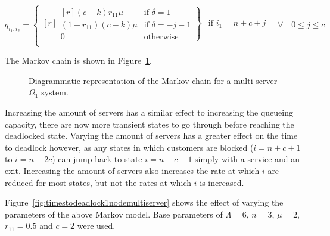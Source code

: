 \documentclass{article}
\begin{document}
\begin{equation}
  q_{i_1, i_2} = \left\{
  \begin{matrix*}[ r ]
    \left. \begin{matrix*}[ r ]
      (c-k)r_{11}\mu & \text{if } \delta = 1 \\
      (1-r_{11})(c-k)\mu & \text{if } \delta = -j-1\\
      0 & \text{otherwise}
    \end{matrix*} \right\} & \text{if } i_1 = n + c + j \\
  \end{matrix*} \right.
  \quad \forall \quad 0 \leq j \leq c
\end{equation}

The Markov chain is shown in Figure~\ref{fig:1nodeMCms}.

\begin{figure}[!htbp]
    
    \caption{Diagrammatic representation of the Markov chain for a multi server $\Omega_1$ system.}
    \label{fig:1nodeMCms}
\end{figure}

Increasing the amount of servers has a similar effect to increasing the queueing capacity, there are now more transient states to go through before reaching the deadlocked state.
Varying the amount of servers has a greater effect on the time to deadlock however, as any states in which customers are blocked ($i=n+c+1$ to $i=n+2c$) can jump back to state $i=n+c-1$ simply with a service and an exit.
Increasing the amount of servers also increases the rate at which $i$ are reduced for most states, but not the rates at which $i$ is increased.

Figure~\ref{fig:timestodeadlock1nodemultiserver} shows the effect of varying the parameters of the above Markov model.
Base parameters of $\Lambda = 6$, $n = 3$, $\mu = 2$, $r_{11} = 0.5$ and $c = 2$ were used.
\end{document}
